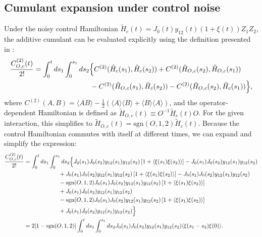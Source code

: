 \documentclass[%
 reprint,
superscriptaddress,
 amsmath,amssymb,
 aps,
pra,
floatfix,
]{revtex4-2}
\begin{document}
\appendix
\begin{widetext}
\section{Cumulant expansion under control noise}
\label{app::controlnoiseCE}
Under the noisy control Hamiltonian $\tilde{H}_c(t)=J_0(t)y_{12}(t)\left(1+\xi(t)\right)Z_1Z_2$, the additive cumulant can be evaluated explicitly using the definition presented in \cite{CombMultiaxis}:
\begin{align}
    \frac{C_{O,c}^{(2)}(t)}{2!}&=\int_0^t ds_1\int_0^{s_1} ds_2\Big\{C^{(2)}(\tilde{H}_c(s_1),\tilde{H}_c(s_2))+C^{(2)}(\tilde{H}_{O,c}(s_2),\tilde{H}_{O,c}(s_1)) \notag\\
    &\qquad\qquad\qquad\qquad-C^{(2)}(\tilde{H}_{O,c}(s_1),\tilde{H}_{c}(s_2))-C^{(2)}(\tilde{H}_{O,c}(s_2),\tilde{H}_{c}(s_1))\Big\},
\end{align}
where $C^{(2)}(A,B)=\langle AB \rangle-\tfrac{1}{2}(\langle A \rangle\langle B \rangle+\langle B \rangle\langle A \rangle)$, and the operator-dependent Hamiltonian is defined as $\tilde{H}_{O,c}(t)\equiv O^{-1}\tilde{H}_{c}(t)O$. For the given interaction, this simplifies to $\tilde{H}_{O,c}(t)=\text{sgn}(O,1,2)\tilde{H}_c(t)$. Because the control Hamiltonian commutes with itself at different times, we can expand and simplify the expression:
\begin{align}
    \frac{C_{O,c}^{(2)}(t)}{2!}&=\int_0^t ds_1\int_0^{s_1}ds_2\Big\{J_0(s_1)J_0(s_2)y_{12}(s_1)y_{12}(s_2)\left[1+\langle \xi(s_1)\xi(s_2)\rangle\right] - J_0(s_1)J_0(s_2)y_{12}(s_1)y_{12}(s_2)\notag\\
    &\qquad\qquad\qquad +J_0(s_1)J_0(s_2)y_{12}(s_1)y_{12}(s_2)\left[1+\langle \xi(s_1)\xi(s_2)\rangle\right] - J_0(s_1)J_0(s_2)y_{12}(s_1)y_{12}(s_2)\notag\\
    &\qquad\qquad\qquad -\text{sgn}(O,1,2)J_0(s_1)J_0(s_2)y_{12}(s_1)y_{12}(s_2)\left[1+\langle \xi(s_1)\xi(s_2)\rangle\right] \notag\\
    &\qquad\qquad\qquad+ J_0(s_1)J_0(s_2)y_{12}(s_1)y_{12}(s_2)\notag\\
    &\qquad\qquad\qquad-\text{sgn}(O,1,2)J_0(s_1)J_0(s_2)y_{12}(s_1)y_{12}(s_2)\left[1+\langle \xi(s_1)\xi(s_2)\rangle\right] \notag\\
    &\qquad\qquad\qquad+ J_0(s_1)J_0(s_2)y_{12}(s_1)y_{12}(s_2)\Big\}\notag\\
    &=2[1-\text{sgn}(O,1,2)]\int_0^t ds_1 \int_0^{s_1}ds_2 J_0(s_1)J_0(s_2)y_{12}(s_1)y_{12}(s_2)\langle \xi(s_1-s_2)\xi(0)\rangle.

\end{align}
\end{widetext}
\end{document}
